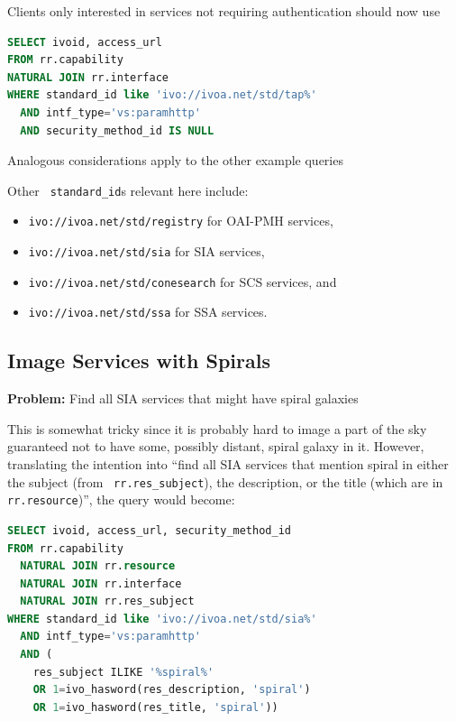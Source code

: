 \documentclass[11pt,a4paper]{ivoa}
\newcommand{\rtent}[1]{\texttt{\color{rtcolor} #1}}
\begin{document}
Clients only interested in services not requiring authentication should
now use

\begin{lstlisting}[language=SQL,flexiblecolumns=true]
SELECT ivoid, access_url
FROM rr.capability
NATURAL JOIN rr.interface
WHERE standard_id like 'ivo://ivoa.net/std/tap%'
  AND intf_type='vs:paramhttp'
  AND security_method_id IS NULL
\end{lstlisting}

Analogous considerations apply to the other example queries

Other \rtent{standard\_id}s relevant here include:


\begin{itemize}

\item \texttt{ivo://ivoa.net/std/registry} for OAI-PMH services,{}

\item \texttt{ivo://ivoa.net/std/sia} for SIA services,{}

\item \texttt{ivo://ivoa.net/std/conesearch} for SCS services,
and{}

\item \texttt{ivo://ivoa.net/std/ssa} for SSA services.{}

\end{itemize}

\subsection{Image Services with Spirals}

\textbf{Problem:} Find all SIA services that might have spiral
galaxies

This is somewhat tricky since it is probably hard to image a part
of the sky guaranteed not to have some, possibly distant, spiral galaxy
in it.  However, translating the intention into ``find all SIA services
that mention spiral in either the subject (from 
\rtent{rr.res\_subject}), the description, or the
title (which are in 
\rtent{rr.resource})'', 
the query would become:


\begin{lstlisting}[language=SQL,flexiblecolumns=true]
SELECT ivoid, access_url, security_method_id
FROM rr.capability 
  NATURAL JOIN rr.resource
  NATURAL JOIN rr.interface
  NATURAL JOIN rr.res_subject
WHERE standard_id like 'ivo://ivoa.net/std/sia%'
  AND intf_type='vs:paramhttp'
  AND (
    res_subject ILIKE '%spiral%'
    OR 1=ivo_hasword(res_description, 'spiral')
    OR 1=ivo_hasword(res_title, 'spiral'))
\end{lstlisting}
\end{document}
